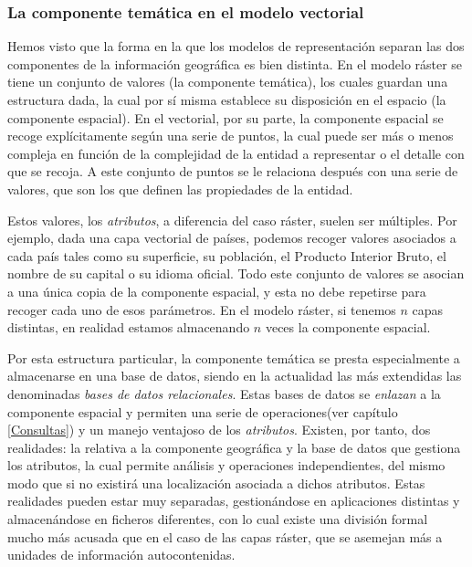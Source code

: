 \begin{multicols}{2}
\subsubsection{La componente temática en el modelo vectorial}

Hemos visto que la forma en la que los modelos de representación separan las dos componentes de la información geográfica es bien distinta. En el modelo ráster se tiene un conjunto de valores (la componente temática), los cuales guardan una estructura dada, la cual por sí misma establece su disposición en el espacio (la componente espacial). En el vectorial, por su parte, la componente espacial se recoge explícitamente según una serie de puntos, la cual puede ser más o menos compleja en función de la complejidad de la entidad a representar o el detalle con que se recoja. A este conjunto de puntos se le relaciona después con una serie de valores, que son los que definen las propiedades de la entidad.

Estos valores, los \emph{atributos}, a diferencia del caso ráster, suelen ser múltiples. Por ejemplo, dada una capa vectorial de países, podemos recoger valores asociados a cada país tales como su superficie, su población, el Producto Interior Bruto, el nombre de su capital o su idioma oficial. Todo este conjunto de valores se asocian a una única copia de la componente espacial, y esta no debe repetirse para recoger cada uno de esos parámetros. En el modelo ráster, si tenemos $n$ capas distintas, en realidad estamos almacenando $n$ veces la componente espacial.

Por esta estructura particular, la componente temática se presta especialmente a almacenarse en una base de datos, siendo en la actualidad las más extendidas las denominadas \emph{bases de datos relacionales}. Estas bases de datos se \emph{enlazan} a la componente espacial y permiten una serie de operaciones(ver capítulo \ref{Consultas}) y un manejo ventajoso de los \emph{atributos}. Existen, por tanto, dos realidades: la relativa a la componente geográfica y la base de datos que gestiona los atributos, la cual permite análisis y operaciones independientes, del mismo modo que si no existirá una localización asociada a dichos atributos. Estas realidades pueden estar muy separadas, gestionándose en aplicaciones distintas y almacenándose en ficheros diferentes, con lo cual existe una división formal mucho más acusada que en el caso de las capas ráster, que se asemejan más a unidades de información autocontenidas.


\end{multicols}
